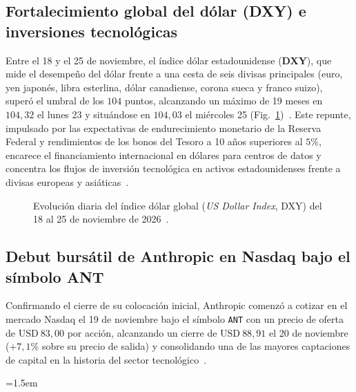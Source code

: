 \documentclass[conference,twocolumn,spanish]{IEEEtran}
\begin{document}
\subsection{Fortalecimiento global del dólar (DXY) e inversiones tecnológicas}
Entre el 18 y el 25 de noviembre, el índice dólar estadounidense (\textbf{DXY}), que mide el desempeño del dólar frente a una cesta de seis divisas principales (euro, yen japonés, libra esterlina, dólar canadiense, corona sueca y franco suizo), superó el umbral de los $104$ puntos, alcanzando un máximo de 19 meses en $104{,}32$ el lunes 23 y situándose en $104{,}03$ el miércoles 25 (Fig.~\ref{fig:dxy_sem3})~\cite{tradingeconomics_dxy_2026,forex_dxy_outlook_2026,investing_dxy_2026}. Este repunte, impulsado por las expectativas de endurecimiento monetario de la Reserva Federal y rendimientos de los bonos del Tesoro a 10 años superiores al $5\%$, encarece el financiamiento internacional en dólares para centros de datos y concentra los flujos de inversión tecnológica en activos estadounidenses frente a divisas europeas y asiáticas~\cite{tradingeconomics_dxy_2026,forex_dxy_outlook_2026}.

\begin{figure}[htbp]
\centering
{}
\caption{Evolución diaria del índice dólar global (\textit{US Dollar Index}, DXY) del 18 al 25 de noviembre de 2026~\cite{investing_dxy_2026}.}
\label{fig:dxy_sem3}
\end{figure}

\subsection{Debut bursátil de Anthropic en Nasdaq bajo el símbolo ANT}
Confirmando el cierre de su colocación inicial, Anthropic comenzó a cotizar en el mercado Nasdaq el 19 de noviembre bajo el símbolo \texttt{ANT} con un precio de oferta de $\text{USD}~83{,}00$ por acción, alcanzando un cierre de $\text{USD}~88{,}91$ el 20 de noviembre ($+7{,}1\%$ sobre su precio de salida) y consolidando una de las mayores captaciones de capital en la historia del sector tecnológico~\cite{markets_anthropic_ant_2026}.

\begingroup
\sloppy
\emergencystretch=1.5em


\endgroup
\end{document}
